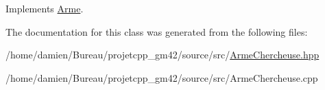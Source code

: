 Implements \hyperlink{classArme_a2092f960c2fb796bea3d9887775fa90e}{Arme}.



The documentation for this class was generated from the following files\-:\begin{DoxyCompactItemize}
\item 
/home/damien/\-Bureau/projetcpp\-\_\-gm42/source/src/\hyperlink{ArmeChercheuse_8hpp}{Arme\-Chercheuse.\-hpp}\item 
/home/damien/\-Bureau/projetcpp\-\_\-gm42/source/src/Arme\-Chercheuse.\-cpp\end{DoxyCompactItemize}
